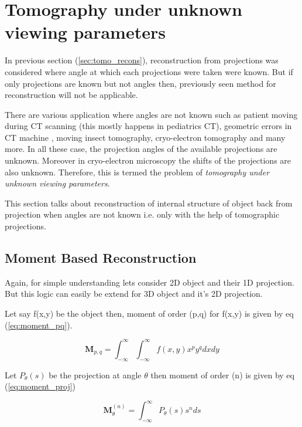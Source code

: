 \documentclass{report}
\begin{document}
\section{Tomography under unknown viewing parameters }
In previous section (\ref{sec:tomo_recons}), reconstruction from projections was considered where angle at which each projections were taken were  known. But if only projections are known but not angles then, previously seen method for reconstruction will not be applicable. 

\noindent
There are various application where angles are not known such as patient moving during CT scanning (this mostly happens in pediatrics CT), geometric errors in CT machine \cite{malhotra2017signal}, moving insect tomography, cryo-electron tomography and many more. In all these case, the projection angles of the available projections are unknown. Moreover in cryo-electron microscopy the shifts of the projections are also unknown. Therefore, this is termed the problem of \textit{tomography under unknown viewing parameters}.

\noindent
This section talks about reconstruction of internal structure of object back from projection when angles are not known i.e. only with the help of tomographic projections.

\subsection{Moment Based Reconstruction}\label{subsec:recont_moment-based}
Again, for simple understanding lets consider 2D object and their 1D projection. But this logic can easily be extend for 3D object and it's 2D projection.

\noindent
Let say f(x,y) be the object then, moment of order (p,q) for f(x,y) is given by eq (\ref{eq:moment_pq}).

\begin{equation}\label{eq:moment_pq}
\boldsymbol{M}_{p,q} =   \int_{-\infty}^{\infty}  \int_{-\infty}^{\infty} f(x,y) x^py^q dxdy
\end{equation}

\noindent
Let $P_\theta(s)$ be the projection at angle $\theta$ then moment of order (n) is given by eq (\ref{eq:moment_proj})

\begin{equation}\label{eq:moment_proj}
\boldsymbol{M}_{\theta}^{(n)} =   \int_{-\infty}^{\infty} P_\theta(s) s^n ds
\end{equation}
\end{document}
